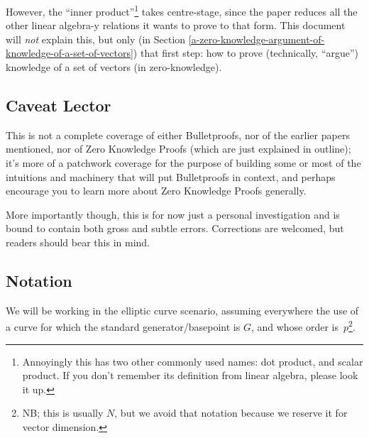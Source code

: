 \documentclass[10pt,a4paper]{article}
\begin{document}
However, the ``inner product''\footnote{Annoyingly this has two other commonly
used names: dot product, and scalar product. If you don't remember its
definition from linear algebra, please look it up.} takes centre-stage,
since the paper reduces all the other linear algebra-y relations it
wants to prove to that form. This document will \emph{not} explain this,
but only (in Section \ref{a-zero-knowledge-argument-of-knowledge-of-a-set-of-vectors}) 
that first step: how to prove (technically,
``argue'') knowledge of a set of vectors (in zero-knowledge).

\hypertarget{caveat-lector}{%
\subsection[Caveat
Lector]{\texorpdfstring{\protect\hypertarget{anchor-10}{}{}Caveat
Lector}{Caveat Lector}}\label{caveat-lector}}

This is not a complete coverage of either Bulletproofs, nor of the
earlier papers mentioned, nor of Zero Knowledge Proofs (which are just
explained in outline); it's more of a patchwork coverage for the purpose
of building some or most of the intuitions and machinery that will put
Bulletproofs in context, and perhaps encourage you to learn more about
Zero Knowledge Proofs generally.

More importantly though, this is for now just a personal investigation
and is bound to contain both gross and subtle errors. Corrections are welcomed, 
but readers should bear this in mind.

\hypertarget{notation}{%
\subsection[Notation]{\texorpdfstring{\protect\hypertarget{anchor-11}{}{}Notation}{Notation}}\label{notation}}

We will be working in the elliptic curve scenario, assuming everywhere
the use of a curve for which the standard generator/basepoint is $G$, and
whose order is~$p$\footnote{NB; this is usually $N$, but we avoid that notation because 
we reserve it for vector dimension.}.
\end{document}
